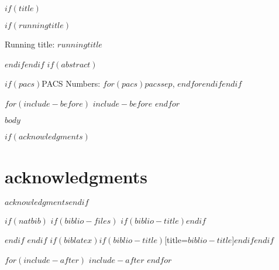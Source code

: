 \documentclass[$if(fontsize)$$fontsize$,$endif$$if(lang)$$lang$,$endif$$if(papersize)$$papersize$,$endif$$for(classoption)$$classoption$$sep$,$endfor$]{$documentclass$}
\renewcommand{\refname}{\bfseries\large\uppercase{references}}
\begin{document}
\doublespacing
\raggedright

$if(title)$\maketitle$if(runningtitle)$\begin{center}Running title: $runningtitle$\end{center}$endif$\newpage$endif$
$if(abstract)$\begin{abstract}$abstract$\end{abstract}$if(pacs)$\bigskip\bigskip\bigskip PACS Numbers: $for(pacs)$$pacs$$sep$, $endfor$$endif$\newpage$endif$

$for(include-before)$
$include-before$
$endfor$

$body$

\cleardoublepage

$if(acknowledgments)$\section*{acknowledgments}$acknowledgments$\cleardoublepage$endif$


$if(natbib)$
$if(biblio-files)$
$if(biblio-title)$\renewcommand\refname{$biblio-title$}$endif$

$endif$
$endif$
$if(biblatex)$\printbibliography$if(biblio-title)$[title=$biblio-title$]$endif$$endif$

\cleardoublepage
\listoffigures

$for(include-after)$
$include-after$
$endfor$

\end{document}

